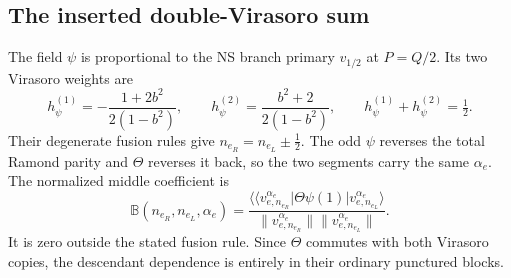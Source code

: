\documentclass[11pt]{article}
\numberwithin{equation}{section}
\begin{document}
\subsection{The inserted double-Virasoro sum}

The field $\psi$ is proportional to the NS branch primary
$v_{1/2}$ at $P=Q/2$. Its two Virasoro weights are
\begin{equation}
 h_\psi^{(1)}=-\frac{1+2b^2}{2(1-b^2)},\qquad
 h_\psi^{(2)}=\frac{b^2+2}{2(1-b^2)},\qquad
 h_\psi^{(1)}+h_\psi^{(2)}=\tfrac12.
 \label{eq:psi-weights}
\end{equation}
Their degenerate fusion rules give $n_{e_R}=n_{e_L}\pm\tfrac12$.
The odd $\psi$ reverses the total Ramond parity and $\Theta$ reverses it
back, so the two segments carry the same $\alpha_e$. The normalized
middle coefficient is
\begin{equation}
 \mathbb B(n_{e_R},n_{e_L},\alpha_e)
 =\frac{\langle\!\langle v_{e,n_{e_R}}^{\alpha_e}|
                    \Theta\psi(1)|v_{e,n_{e_L}}^{\alpha_e}\rangle}
        {\|v_{e,n_{e_R}}^{\alpha_e}\|\|v_{e,n_{e_L}}^{\alpha_e}\|}.
 \label{eq:middle-branching}
\end{equation}
It is zero outside the stated fusion rule. Since $\Theta$ commutes with
both Virasoro copies, the descendant dependence is entirely in their
ordinary punctured blocks.
\end{document}
